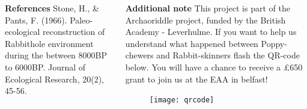 \documentclass[final]{beamer}
\begin{document}
\begin{frame}[t]
\begin{columns}[t]
        \begin{block}{\textbf{References}}
            Stone, H., \& Pants, F. (1966). Paleo-ecological reconstruction of Rabbithole environment during the between 8000BP to 6000BP. Journal of Ecological Research, 20(2), 45-56.
        \end{block}
        \vspace{8cm}
    \begin{block}{\textbf{Additional note}}
        \small
    This project is part of the Archaoriddle project, funded by the British Academy - Leverhulme. If you want to help us understand what happened between Poppy-chewers and Rabbit-skinners flash the QR-code below. You will have a chance to receive a £650 grant to join us at the EAA in belfast! 
            \begin{figure}
                \texttt{[image: qrcode]}
            \end{figure}
        \end{block}

    \end{columns}

\end{frame}
\end{document}
